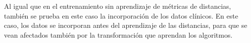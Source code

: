 Al igual que en el entrenamiento sin aprendizaje de métricas de distancias, también se prueba en este caso la incorporación de los datos clínicos. En este caso, los datos se incorporan antes del aprendizaje de las distancias, para que se vean afectados también por la transformación que aprendan los algoritmos.

\endinput
